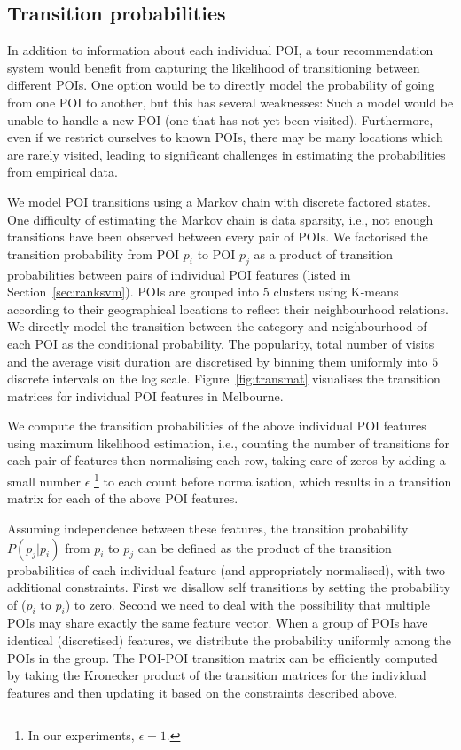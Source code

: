 \subsection{Transition probabilities}
\label{sec:transition}

In addition to information about each individual POI, a tour recommendation system would benefit
from capturing the likelihood of transitioning between different POIs. One option would be to
directly model the probability of going from one POI to another, but this has several weaknesses:
Such a model would be unable to handle a new POI (one that has not yet been visited).
Furthermore, even if we restrict ourselves to known POIs, there may be many locations which
are rarely visited, leading to significant challenges in estimating the probabilities from
empirical data.

We model POI transitions using a Markov chain with discrete factored states.
One difficulty of estimating the Markov chain is data sparsity, 
i.e., not enough transitions have been observed between every pair of POIs. 
We factorised the transition probability from POI $p_i$ to POI $p_j$ %
as a product of transition probabilities between pairs of 
individual POI features (listed in Section~\ref{sec:ranksvm}).
POIs are grouped into $5$ clusters using K-means according to their geographical locations
to reflect their neighbourhood relations.
We directly model the transition between the category and neighbourhood of each POI as the conditional probability.
The popularity, total number of visits and the average visit duration are discretised by binning
them uniformly into $5$ discrete intervals on the log scale.
Figure~\ref{fig:transmat} visualises the transition matrices for individual POI features in Melbourne.

We compute the transition probabilities of the above individual POI features
using maximum likelihood estimation,
i.e., counting the number of transitions for each pair of features then normalising each row,
taking care of zeros by adding a small number $\epsilon$
\footnote{In our experiments, $\epsilon = 1$.}
to each count before normalisation,
which results in a transition matrix for each of the above POI features.

Assuming independence between these features,
the transition probability $P(p_j | p_i)$ from $p_i$ to $p_j$ can be defined as the product
of the transition probabilities of each individual feature (and appropriately normalised),
with two additional constraints.
First we disallow self transitions by setting the probability of ($p_i$ to $p_i$) to zero.
Second we need to deal with the possibility that multiple POIs may share exactly the same
feature vector.
When a group of POIs have identical (discretised) features, we distribute the probability
uniformly among the POIs in the group. 
The POI-POI transition matrix can be efficiently computed by taking the Kronecker product of
the transition matrices for the individual features and then updating it based on the constraints described above.

